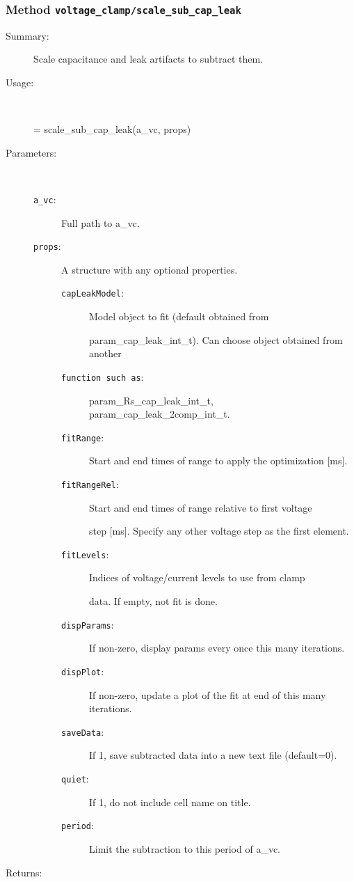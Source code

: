 \subsubsection[Method \texttt{scale\_sub\_cap\_leak}]{Method \texttt{voltage\_clamp/scale\_sub\_cap\_leak}}%
%
\label{ref_voltage_clamp__scale_sub_cap_leak}%
\hypertarget{ref_voltage_clamp__scale_sub_cap_leak}{}%
\begin{description}
\item[Summary:]Scale capacitance and leak artifacts to subtract them.
%
\item[Usage:]~%
\begin{lyxcode}%
[f\_capleak sub\_vc] = scale\_sub\_cap\_leak(a\_vc, props)
%
\end{lyxcode}%
%
%
\item[Parameters:]~
\begin{description}%
\item[\texttt{a\_vc}:]
 Full path to a\_vc.
\item[\texttt{props}:]
 A structure with any optional properties.
\begin{description}%
\item[\texttt{capLeakModel}:]
 Model object to fit (default obtained from

param\_cap\_leak\_int\_t). Can choose object obtained from another
\item[\texttt{function such as}:]
 param\_Rs\_cap\_leak\_int\_t, param\_cap\_leak\_2comp\_int\_t.
\item[\texttt{fitRange}:]
 Start and end times of range to apply the optimization [ms].
\item[\texttt{fitRangeRel}:]
 Start and end times of range relative to first voltage

step [ms]. Specify any other voltage step as the first element.
\item[\texttt{fitLevels}:]
 Indices of voltage/current levels to use from clamp

data. If empty, not fit is done.
\item[\texttt{dispParams}:]
 If non-zero, display params every once this many iterations.
\item[\texttt{dispPlot}:]
 If non-zero, update a plot of the fit at end of this many iterations.
\item[\texttt{saveData}:]
 If 1, save subtracted data into a new text file (default=0).
\item[\texttt{quiet}:]
 If 1, do not include cell name on title.
\item[\texttt{period}:]
 Limit the subtraction to this period of a\_vc.
\end{description}%
\end{description}%
%
\item[Returns:
]~


\end{description}
